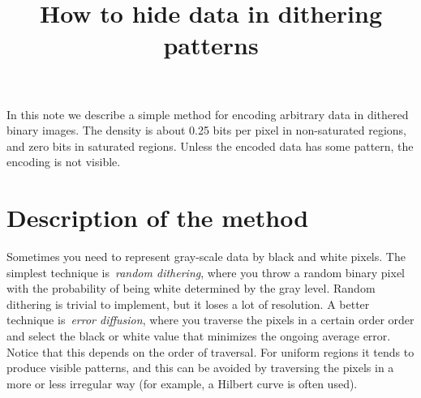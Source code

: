 \title{How to hide data in dithering patterns}

In this note we describe a simple method for encoding arbitrary data in
dithered binary images.
The density is about 0.25 bits per pixel in non-saturated
regions, and zero bits in saturated regions.
Unless the encoded data has some pattern, the encoding is not visible.

\section{Description of the method}

Sometimes you need to represent gray-scale data by black and white pixels.
The simplest technique is~\emph{random dithering}, where you throw a random
binary pixel with the probability of being white determined by the gray
level.  Random dithering is trivial to implement, but it loses a lot of
resolution.  A better technique is~\emph{error diffusion}, where you traverse
the pixels in a certain order order and select the black or white value that
minimizes the ongoing average error.  Notice that this depends on the order
of traversal.  For uniform regions it tends to produce visible patterns, and
this can be avoided by traversing the pixels in a more or less irregular way
(for example, a Hilbert curve is often used).


